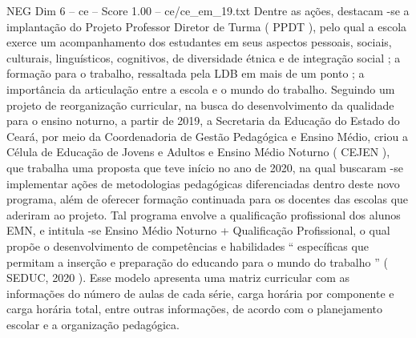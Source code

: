 \begin{textsample}{NEG Dim 6 – ce – Score 1.00 – ce/ce\_em\_19.txt}
Dentre as ações, destacam -se a implantação do Projeto Professor Diretor de Turma ( PPDT ), pelo qual a escola exerce um acompanhamento dos estudantes em seus aspectos pessoais, sociais, culturais, linguísticos, cognitivos, de diversidade étnica e de integração social ; a formação para o trabalho, ressaltada pela LDB em mais de um ponto ; a importância da articulação entre a escola e o mundo do trabalho.
Seguindo um projeto de reorganização curricular, na busca do desenvolvimento da qualidade para o ensino noturno, a partir de 2019, a Secretaria da Educação do Estado do Ceará, por meio da Coordenadoria de Gestão Pedagógica e Ensino Médio, criou a Célula de Educação de Jovens e Adultos e Ensino Médio Noturno ( CEJEN ), que trabalha uma proposta que teve início no ano de 2020, na qual buscaram -se implementar ações de metodologias pedagógicas diferenciadas dentro deste novo programa, além de oferecer formação continuada para os docentes das escolas que aderiram ao projeto.
Tal programa envolve a qualificação profissional dos alunos EMN, e intitula -se Ensino Médio Noturno + Qualificação Profissional, o qual propõe o desenvolvimento de competências e habilidades “ específicas que permitam a inserção e preparação do educando para o mundo do trabalho ” ( SEDUC, 2020 ).
Esse modelo apresenta uma matriz curricular com as informações do número de aulas de cada série, carga horária por componente e carga horária total, entre outras informações, de acordo com o planejamento escolar e a organização pedagógica.

\end{textsample}
